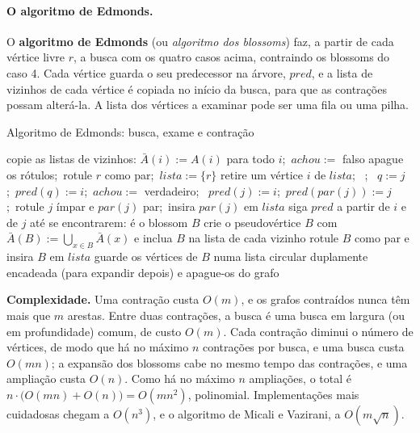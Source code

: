 \paragraph{O algoritmo de Edmonds.} O \textbf{algoritmo de Edmonds} (ou \emph{algoritmo dos blossoms}) faz, a partir de cada vértice livre $r$, a busca com os quatro casos acima, contraindo os blossoms do caso 4. Cada vértice guarda o seu predecessor na árvore, $pred$, e a lista de vizinhos de cada vértice é copiada no início da busca, para que as contrações possam alterá-la. A lista dos vértices a examinar pode ser uma fila ou uma pilha.
\begin{pseudo}{Algoritmo de Edmonds: busca, exame e contração}
\begin{algorithmic}
 
  \State copie as listas de vizinhos: $\bar A(i):=A(i)$ para todo $i$;\ $achou:=$ falso
  \State apague os rótulos;\ rotule $r$ como par;\ $lista:=\{r\}$
    \State retire um vértice $i$ de $lista$;\ 
     \Return {} \EndIf
  \EndWhile
\EndProcedure
{} 
     \State {};\ \Return {}
     \State $q:=j$;\ $pred(q):=i$;\ $achou:=$ verdadeiro;\ \Return {}
     
      \State $pred(j):=i$;\ $pred(par(j)):=j$;\ rotule $j$ ímpar e $par(j)$ par;\ insira $par(j)$ em $lista$
    \EndIf {}
  \EndFor
\EndProcedure
{}
  \State siga $pred$ a partir de $i$ e de $j$ até se encontrarem: é o blossom $B$ 
  \State crie o pseudovértice $B$ com $\bar A(B):=\bigcup_{x\in B}\bar A(x)$ e inclua $B$ na lista de cada vizinho 
  \State rotule $B$ como par e insira $B$ em $lista$
  \State guarde os vértices de $B$ numa lista circular duplamente encadeada (para expandir depois) e apague-os do grafo
\EndProcedure
\end{algorithmic}
\end{pseudo}
\textbf{Complexidade.} Uma contração custa $O(m)$, e os grafos contraídos nunca têm mais que $m$ arestas. Entre duas contrações, a busca é uma busca em largura (ou em profundidade) comum, de custo $O(m)$. Cada contração diminui o número de vértices, de modo que há no máximo $n$ contrações por busca, e uma busca custa $O(mn)$; a expansão dos blossoms cabe no mesmo tempo das contrações, e uma ampliação custa $O(n)$. Como há no máximo $n$ ampliações, o total é $n\cdot\bigl(O(mn)+O(n)\bigr)=O(mn^2)$, polinomial. Implementações mais cuidadosas chegam a $O(n^3)$, e o algoritmo de Micali e Vazirani, a $O(m\sqrt n)$.

